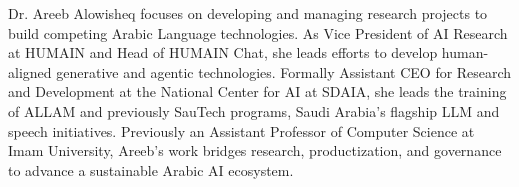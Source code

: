 Dr. Areeb Alowisheq focuses on developing and managing research projects to build competing Arabic Language technologies. As Vice President of AI Research at HUMAIN and Head of HUMAIN Chat, she leads efforts to develop human-aligned generative and agentic technologies. Formally Assistant CEO for Research and Development at the National Center for AI at SDAIA, she leads the training of ALLAM and previously  SauTech programs, Saudi Arabia’s flagship LLM and speech initiatives. Previously an Assistant Professor of Computer Science at Imam University, Areeb’s work bridges research, productization, and governance to advance a sustainable Arabic AI ecosystem.